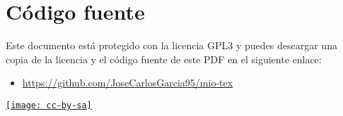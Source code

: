 \section{Código fuente}
Este documento está protegido con la licencia GPL3 y puedes descargar una copia de la licencia y el código fuente de este PDF en el siguiente enlace:
\begin{itemize}
	\item \href{https://github.com/JoseCarlosGarcia95/mio-tex}{https://github.com/JoseCarlosGarcia95/mio-tex}
\end{itemize}
\begin{center}
    \href{http://creativecommons.org/licenses/by-sa/3.0/es/}{\texttt{[image: cc-by-sa]}}
\end{center}